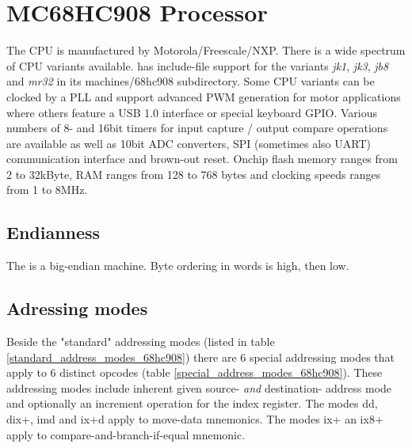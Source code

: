 \chapter{MC68HC908 Processor}
\label{processor:MC68HC908}

The  CPU is manufactured by Motorola/Freescale/NXP. There is a wide spectrum of CPU variants available.
\dasm has include-file support for the variants {\it{jk1}}, {\it{jk3}}, {\it{jb8}} and {\it{mr32}} in its machines/68hc908 subdirectory.
Some CPU variants can be clocked by a PLL and support advanced PWM generation for motor applications where others feature a USB 1.0 interface 
or special keyboard GPIO. Various numbers of 8- and 16bit timers for input capture / output compare operations are available as well as 10bit 
ADC converters, SPI (sometimes also UART) communication interface and brown-out reset. Onchip flash memory ranges from 2 to 32kByte, RAM ranges 
from 128 to 768 bytes and clocking speeds ranges from 1 to 8MHz.

\section{Endianness}

The  is a big-endian machine. Byte ordering in words is high, then low.

\section{Adressing modes}

Beside the "standard" addressing modes (listed in table \ref{standard_address_modes_68hc908}) there are 6 special addressing modes that 
apply to 6 distinct opcodes (table \ref{special_address_modes_68hc908}). These addressing modes include inherent given source- \emph{and} destination- 
address mode and optionally an increment operation for the index register. The modes dd, dix+, imd and ix+d apply to move-data mnemonics.
The modes ix+ an ix8+ apply to compare-and-branch-if-equal mnemonic.




